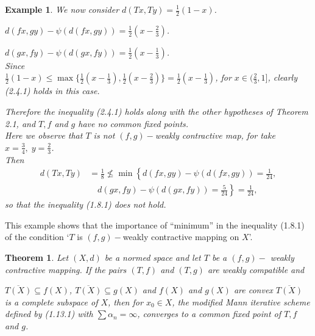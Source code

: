 \documentclass[11]{article}
\newtheorem{theorem}[definition]{Theorem}
\newtheorem{example}[definition]{Example}
\numberwithin{equation}{definition}
\begin{document}
\begin{example}
We now consider $d(Tx,Ty)=\frac{1}{2}(1-x)$.

$d(fx,gy)-\psi(d(fx,gy))=\frac{1}{2}(x-\frac{2}{3})$.

$d(gx,fy)-\psi(d(gx,fy))=\frac{1}{2}(x-\frac{1}{3})$.\\
Since\\
$\frac{1}{2}(1-x)\leq\max\{\frac{1}{2}(x-\frac{1}{3}),\frac{1}{2}(x-\frac{2}{3})\}=\frac{1}{2}(x-\frac{1}{3})$, for $x\in(\frac{2}{3},1]$, clearly (2.4.1) holds in this case.

Therefore the inequality (2.4.1) holds along with the other hypotheses of Theorem 2.1, and $T,f$ and $g$ have no common fixed points.\\
Here we observe that $T$ is not $(f,g)-$weakly contractive map, for take $x=\frac{3}{4},\;y=\frac{2}{3}$.\\
Then
\begin{align*}
d(Tx,Ty) &= \frac{1}{8} \not\leq \min\left\{d(fx,gy)-\psi(d(fx,gy))=\frac{1}{24},\right. \\
&\left.\quad d(gx,fy)-\psi(d(gx,fy))=\frac{5}{24}\right\}=\frac{1}{24},
\end{align*}
so that the inequality (1.8.1) does not hold.
\end{example}

This example shows that the importance of ``minimum'' in the inequality (1.8.1) of the condition `$T$ is $(f,g)-$weakly contractive mapping on $X$'.

\begin{theorem}
Let $(X,d)$ be a normed space and let $T$ be a $(f,g)-$ weakly contractive mapping. If the pairs $(T,f)$ and $(T,g)$ are weakly compatible and

$\overline{T(X)}\subseteq f(X)$, $\overline{T(X)}\subseteq g(X)$ and $f(X)$ and $g(X)$ are convex $\overline{T(X)}$ is a complete subspace of $X$, then for $x_{0}\in X$, the modified Mann iterative scheme defined by (1.13.1) with $\sum\alpha_{n}=\infty$, converges to a common fixed point of $T,f$ and $g$.
\end{theorem}
\end{document}
